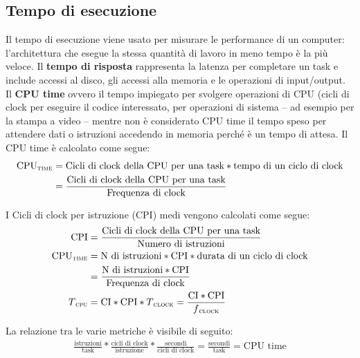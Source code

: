 \subsection{Tempo di esecuzione} Il tempo di esecuzione viene usato per misurare le performance di un computer: l'architettura che esegue la stessa quantità di lavoro in meno tempo è la più veloce. Il \textbf{tempo di risposta} rappresenta la latenza per completare un task e include accessi al disco, gli accessi alla memoria e le operazioni di input/output. Il \textbf{CPU time} ovvero il tempo impiegato per svolgere operazioni di CPU (cicli di clock per eseguire il codice interessato, per operazioni di sistema -- ad esempio per la stampa a video -- mentre non è considerato CPU time il tempo speso per attendere dati o istruzioni accedendo in memoria perché è un tempo di attesa. 
Il CPU time è calcolato come segue:
\begin{align*}
\text{CPU\textsubscript{\textsc{time}}} &= \text{Cicli di clock della CPU per una task} * \text{tempo di un ciclo di clock}\\
&= \frac{\text{Cicli di clock della CPU per una task}}{\text{Frequenza di clock}}
\end{align*}

I Cicli di clock per istruzione (CPI) medi vengono calcolati come segue:
\begin{align*}
\text{CPI} &= \frac{\text{Cicli di clock della CPU per una task}}{\text{Numero di istruzioni}}\\
\text{CPU\textsubscript{\textsc{time}}} &= \text{N di istruzioni} * \text{CPI} * \text{durata di un ciclo di clock}\\
&= \frac{\text{N di istruzioni} * \text{CPI}}{\text{Frequenza di clock}}\\
T\textsubscript{\textsc{{cpu}}} &= \text{CI}* \text{CPI} * T\textsubscript{\textsc{clock}} = \frac{\text{CI} * \text{CPI}}{f\textsubscript{\textsc{{clock}}}}
\end{align*}

La relazione tra le varie metriche è visibile di seguito:
\begin{align*}
    \frac{\text{istruzioni}}{\text{task}} * \frac{\text{cicli di clock}}{\text{istruzione}} * \frac{\text{secondi}}{\text{cicli di clock}}= \frac{\text{secondi}}{\text{task}} = \text{CPU time}
\end{align*}

